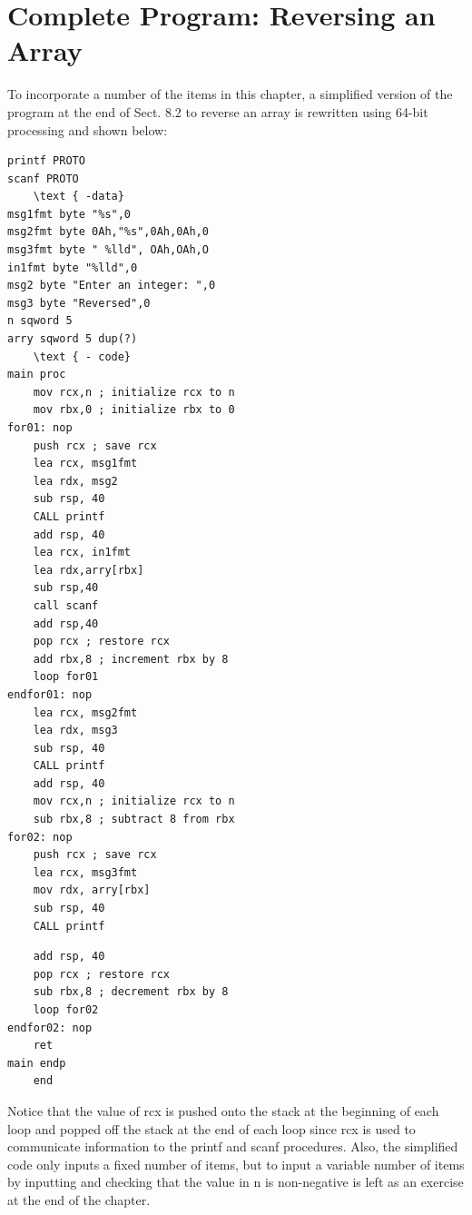 \documentclass[10pt]{book}
\begin{document}
\section{Complete Program: Reversing an Array}
To incorporate a number of the items in this chapter, a simplified version of the program at the end of Sect. 8.2 to reverse an array is rewritten using 64-bit processing and shown below:

\begin{verbatim}
printf PROTO
scanf PROTO
    \text { -data}
msg1fmt byte "%s",0
msg2fmt byte 0Ah,"%s",0Ah,0Ah,0
msg3fmt byte " %lld", OAh,OAh,O
in1fmt byte "%lld",0
msg2 byte "Enter an integer: ",0
msg3 byte "Reversed",0
n sqword 5
arry sqword 5 dup(?)
    \text { - code}
main proc
    mov rcx,n ; initialize rcx to n
    mov rbx,0 ; initialize rbx to 0
for01: nop
    push rcx ; save rcx
    lea rcx, msg1fmt
    lea rdx, msg2
    sub rsp, 40
    CALL printf
    add rsp, 40
    lea rcx, in1fmt
    lea rdx,arry[rbx]
    sub rsp,40
    call scanf
    add rsp,40
    pop rcx ; restore rcx
    add rbx,8 ; increment rbx by 8
    loop for01
endfor01: nop
    lea rcx, msg2fmt
    lea rdx, msg3
    sub rsp, 40
    CALL printf
    add rsp, 40
    mov rcx,n ; initialize rcx to n
    sub rbx,8 ; subtract 8 from rbx
for02: nop
    push rcx ; save rcx
    lea rcx, msg3fmt
    mov rdx, arry[rbx]
    sub rsp, 40
    CALL printf
\end{verbatim}

\begin{verbatim}
    add rsp, 40
    pop rcx ; restore rcx
    sub rbx,8 ; decrement rbx by 8
    loop for02
endfor02: nop
    ret
main endp
    end
\end{verbatim}

Notice that the value of rcx is pushed onto the stack at the beginning of each loop and popped off the stack at the end of each loop since rcx is used to communicate information to the printf and scanf procedures. Also, the simplified code only inputs a fixed number of items, but to input a variable number of items by inputting and checking that the value in n is non-negative is left as an exercise at the end of the chapter.


\end{document}
